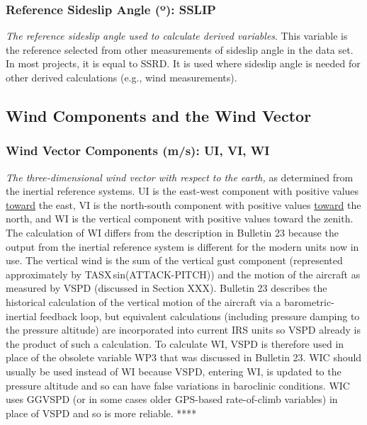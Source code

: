 \documentclass[
  english,
]{book}
\begin{document}
\hypertarget{sslip}{%
\subsubsection*{\texorpdfstring{Reference Sideslip Angle ({º}):
SSLIP}{Reference Sideslip Angle (º): SSLIP}}\label{sslip}}

\emph{The reference sideslip angle used to calculate derived variables}.
This variable is the reference selected from other measurements of
sideslip angle in the data set. In most projects, it is equal to SSRD.
It is used where sideslip angle is needed for other derived calculations
(e.g., wind measurements).

\hypertarget{wind-components-and-the-wind-vector}{%
\subsection{Wind Components and the Wind
Vector}\label{wind-components-and-the-wind-vector}}

\hypertarget{ui-vi-wi}{%
\subsubsection*{Wind Vector Components (m/s): UI, VI,
WI}\label{ui-vi-wi}}

\emph{The three-dimensional wind vector with respect to the earth,} as
determined from the inertial reference systems. UI is the east-west
component with positive values \underline{toward} the east, VI is the
north-south component with positive values \underline{toward} the north,
and WI is the vertical component with positive values toward the zenith.
The calculation of WI differs from the description in Bulletin 23
because the output from the inertial reference system is different for
the modern units now in use. The vertical wind is the sum of the
vertical gust component (represented approximately by
TASX sin(ATTACK-PITCH)) and the motion of the aircraft as measured by
VSPD (discussed in Section XXX). Bulletin 23 describes the historical
calculation of the vertical motion of the aircraft via a
barometric-inertial feedback loop, but equivalent calculations
(including pressure damping to the pressure altitude) are incorporated
into current IRS units so VSPD already is the product of such a
calculation. To calculate WI, VSPD is therefore used in place of the
obsolete variable WP3 that was discussed in Bulletin 23. WIC should
usually be used instead of WI because VSPD, entering WI, is updated to
the pressure altitude and so can have false variations in baroclinic
conditions. WIC uses GGVSPD (or in some cases older GPS-based
rate-of-climb variables) in place of VSPD and so is more reliable. ****
\end{document}
